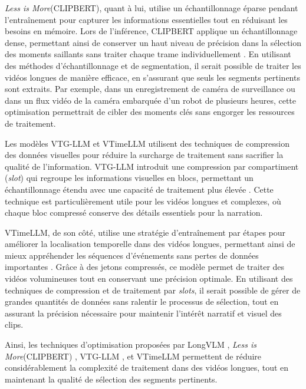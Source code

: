 \documentclass[livre]{udes-genie-these}
\begin{document}
\textit{Less is More}(CLIPBERT), quant à lui, utilise un échantillonnage éparse pendant l’entraînement pour capturer les informations essentielles tout en réduisant les besoins en mémoire. Lors de l’inférence, CLIPBERT applique un échantillonnage dense, permettant ainsi de conserver un haut niveau de précision dans la sélection des moments saillants sans traiter chaque trame individuellement \cite{lei2021_clipbert}. En utilisant des méthodes d’échantillonnage et de segmentation, il serait possible de traiter les vidéos longues de manière efficace, en s’assurant que seuls les segments pertinents sont extraits. Par exemple, dans un enregistrement de caméra de surveillance ou dans un flux vidéo de la caméra embarquée d’un robot de plusieurs heures, cette optimisation permettrait de cibler des moments clés sans engorger les ressources de traitement.

Les modèles VTG-LLM \cite{guo2024_vtgllm} et VTimeLLM \cite{huang2024_vtimellm} utilisent des techniques de compression des données visuelles pour réduire la surcharge de traitement sans sacrifier la qualité de l’information. VTG-LLM introduit une compression par compartiment  (\textit{slot}) qui regroupe les informations visuelles en blocs, permettant un échantillonnage étendu avec une capacité de traitement plus élevée \cite{guo2024_vtgllm}. Cette technique est particulièrement utile pour les vidéos longues et complexes, où chaque bloc compressé conserve des détails essentiels pour la narration. 

VTimeLLM, de son côté, utilise une stratégie d’entraînement par étapes pour améliorer la localisation temporelle dans des vidéos longues, permettant ainsi de mieux appréhender les séquences d’événements sans pertes de données importantes \cite{huang2024_vtimellm}. Grâce à des jetons compressés, ce modèle permet de traiter des vidéos volumineuses tout en conservant une précision optimale. En utilisant des techniques de compression et de traitement par \textit{slots}, il serait possible de gérer de grandes quantités de données sans ralentir le processus de sélection, tout en assurant la précision nécessaire pour maintenir l’intérêt narratif et visuel des clips.

Ainsi, les techniques d’optimisation proposées par LongVLM \cite{weng2024}, \textit{Less is More}(CLIPBERT) \cite{lei2021_clipbert}, VTG-LLM \cite{guo2024_vtgllm}, et VTimeLLM \cite{huang2024_vtimellm} permettent de réduire considérablement la complexité de traitement dans des vidéos longues, tout en maintenant la qualité de sélection des segments pertinents.
\end{document}

